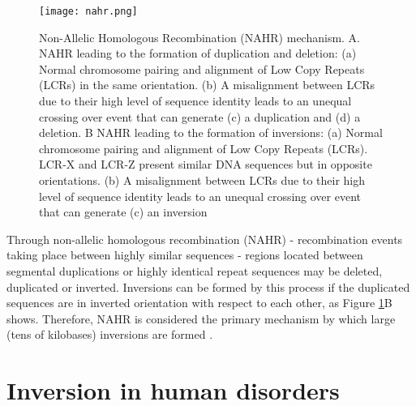\begin{figure}[h]

  \centering
    \texttt{[image: nahr.png]}

  \caption{Non-Allelic Homologous Recombination (NAHR) mechanism. A. NAHR leading to the formation of duplication and deletion: (a) Normal chromosome pairing and alignment of Low Copy Repeats (LCRs) in the same orientation. (b) A misalignment between LCRs due to their high level of sequence identity leads to an unequal crossing over event that can generate (c) a duplication and (d) a deletion. B NAHR leading to the formation of inversions: (a) Normal chromosome pairing and alignment of Low Copy Repeats (LCRs). LCR-X and LCR-Z present similar DNA sequences but in opposite orientations. (b) A misalignment between LCRs due to their high level of sequence identity leads to an unequal crossing over event that can generate (c) an inversion}
  \label{fig:nahr}
\end{figure}

Through non-allelic homologous recombination (NAHR) - recombination events taking place between highly similar sequences - regions located between segmental duplications or highly identical repeat sequences may be deleted, duplicated or inverted. Inversions can be formed by this process if the duplicated sequences are in inverted orientation with respect to each other, as Figure \ref{fig:nahr}B shows. Therefore, NAHR is considered the primary mechanism by which large (tens of kilobases) inversions are formed \cite{feuk_inversion_2010}. 

\section{Inversion in human disorders}


